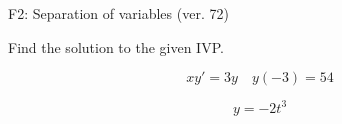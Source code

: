 \begin{exercise}
  \begin{exerciseTitle}F2: Separation of variables (ver. 72)\end{exerciseTitle}
  \begin{exerciseStatement}
    
Find the solution to the given IVP.

    
\[xy'= 3 y \hspace{1em} y( -3 ) = 54\]

  \end{exerciseStatement}
  \begin{exerciseAnswer}
    
\[y= -2 t^ 3\]

  \end{exerciseAnswer}
\end{exercise}
